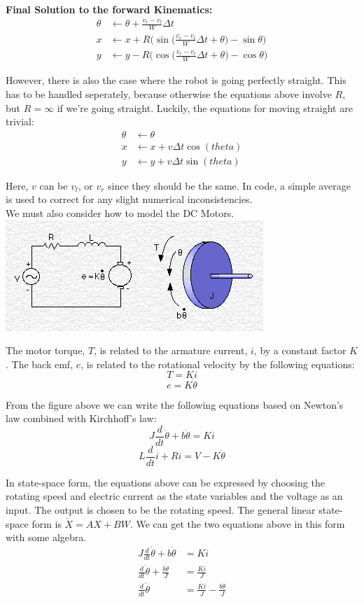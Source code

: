 \documentclass{article}
\begin{document}
\textbf{Final Solution to the forward Kinematics:}
\begin{align}
 \theta &\leftarrow \theta + \frac{v_r-v_l}{W}\Delta t \\
  x &\leftarrow x+R\Bigg(\sin{\Big(\frac{v_r-v_l}{W}\Delta t+\theta\Big)}-\sin{\theta}\Bigg) \\
  y &\leftarrow y-R\Bigg(\cos{\Big(\frac{v_r-v_l}{W}\Delta t+\theta\Big)}-\cos{\theta}\Bigg)
\end{align}

However, there is also the case where the robot is going perfectly straight. This has to be handled seperately, because otherwise the equations above involve $R$, but $R=\infty$ if we're going straight. Luckily, the equations for moving straight are trivial:
\begin{align}
 \theta &\leftarrow \theta \\
  x &\leftarrow x + v\Delta t\cos(theta) \\
  y &\leftarrow y + v\Delta t\sin(theta)
\end{align}

Here, $v$ can be $v_l$, or $v_r$ since they should be the same. In code, a simple average is used to correct for any slight numerical inconsistencies. \\

We must also consider how to model the DC Motors. \\

\includegraphics[scale=0.5]{./dc_motor_model.png}

The motor torque, $T$, is related to the armature current, $i$, by a constant factor $K$. The back emf, $e$, is related to the rotational velocity by the following equations:
$$T=Ki$$
$$e=K\dot{\theta}$$

From the figure above we can write the following equations based on Newton's law combined with Kirchhoff's law:
$$J\frac{d}{dt}\dot{\theta} + b\dot{\theta} = Ki$$
$$L\frac{d}{dt}i+Ri=V-K\dot{\theta}$$

In state-space form, the equations above can be expressed by choosing the rotating speed and electric current as the state variables and the voltage as an input. The output is chosen to be the rotating speed. The general linear state-space form is $\dot{X} = AX + BW$. We can get the two equations above in this form with some algebra.
\begin{align}
  J\frac{d}{dt}\dot{\theta} + b\dot{\theta} &= Ki \\
  \frac{d}{dt}\dot{\theta} + \frac{b\dot{\theta}}{J} &= \frac{Ki}{J} \\
  \frac{d}{dt}\dot{\theta} &= \frac{Ki}{J} - \frac{b\dot{\theta}}{J}
\end{align}
\end{document}
